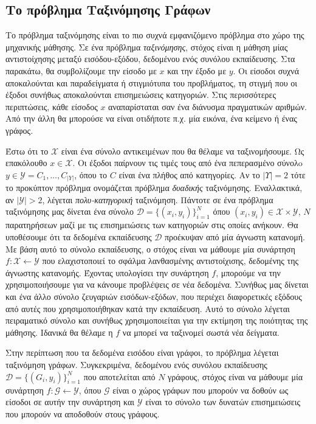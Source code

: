 \subsection{Το πρόβλημα Ταξινόμησης Γράφων}
\label{subsection:graph_classification}
Το πρόβλημα ταξινόμησης είναι το πιο συχνά εμφανιζόμενο πρόβλημα στο χώρο της μηχανικής μάθησης.
Σε ένα πρόβλημα \textit{ταξινόμησης}, στόχος είναι η μάθηση μίας αντιστοίχησης μεταξύ εισόδου-εξόδου, δεδομένου ενός συνόλου εκπαίδευσης.
Στα παρακάτω, θα συμβολίζουμε την είσοδο με $x$ και την έξοδο με $y$.
Οι είσοδοι συχνά αποκαλούνται και παραδείγματα ή στιγμιότυπα του προβλήματος, τη στιγμή που οι έξοδοι συνήθως αποκαλούνται επισημειώσεις κατηγοριών.
Στις περισσότερες περιπτώσεις, κάθε είσοδος $x$ αναπαρίσταται σαν ένα διάνυσμα πραγματικών αριθμών.
Από την άλλη θα μπορούσε να είναι οτιδήποτε π.χ. μία εικόνα, ένα κείμενο ή ένας γράφος.\par
Έστω ότι το $\mathcal{X}$ είναι ένα σύνολο αντικειμένων που θα θέλαμε να ταξινομήσουμε.
Ως επακόλουθο $x \in \mathcal{X}$.
Οι έξοδοι παίρνουν τις τιμές τους από ένα πεπερασμένο σύνολo $y \in \mathcal{Y} = {C_{1}, \dots, C_{|Y|}}$, όπου το $C$ είναι ένα πλήθος από κατηγορίες.
Αν το $|\mathcal{Υ}| = 2$ τότε το προκύπτον πρόβλημα ονομάζεται πρόβλημα \textit{δυαδικής} ταξινόμησης.
Εναλλακτικά, αν $|\mathcal{Y}| > 2$, λέγεται \textit{πολυ-κατηγορική} ταξινόμηση.
Πάντοτε σε ένα πρόβλημα ταξινόμησης μας δίνεται ένα σύνολο $\mathcal{D} = \{(x_{i}, y_{i})\}^{N}_{i=1}$ όπου $(x_{i}, y_{i}) \in \mathcal{X} \times \mathcal{Y}$, $Ν$ παρατηρήσεων μαζί με τις επισημειώσεις των κατηγοριών στις οποίες ανήκουν.
Θα υποθέσουμε ότι τα δεδομένα εκπαίδευσης $\mathcal{D}$ προέκυψαν από μία άγνωστη κατανομή.
Με βάση αυτό το σύνολο εκπαίδευσης, ο στόχος είναι να μάθουμε μία συνάρτηση $f: \mathcal{X} \leftarrow \mathcal{Y}$ που ελαχιστοποιεί το σφάλμα λανθασμένης αντιστοίχισης, δεδομένης της άγνωστης κατανομής.
Έχοντας υπολογίσει την συνάρτηση $f$, μπορούμε να την χρησιμοποιήσουμε για να κάνουμε προβλέψεις σε νέα δεδομένα.
Συνήθως μας δίνεται και ένα άλλο σύνολο ζευγαριών εισόδων-εξόδων, που περιέχει διαφορετικές εξόδους από αυτές που χρησιμοποιήθηκαν κατά την εκπαίδευση.
Αυτό το σύνολο λέγεται πειραματικό σύνολο και συνήθως χρησιμοποιείται για την εκτίμηση της ποιότητας της μάθησης.
Ιδανικά θα θέλαμε η $f$ να μπορεί να ταξινομεί σωστά νέα δείγματα.\par
Στην περίπτωση που τα δεδομένα εισόδου είναι γράφοι, το πρόβλημα λέγεται ταξινόμηση γράφων.
Συγκεκριμένα, δεδομένου ενός συνόλου εκπαίδευσης $\mathcal{D} = \{(G_{i}, y_{i})\}^{N}_{i=1}$ που αποτελείται από $N$ γράφους, στόχος είναι να μάθουμε μία συνάρτηση $f: \mathcal{G} \leftarrow \mathcal{Y}$, όπου $\mathcal{G}$ είναι ο χώρος γράφων που μπορούν να δοθούν ως είσοδοι σε αυτήν την συνάρτηση και $\mathcal{Y}$ είναι το σύνολο των δυνατών επισημειώσεις που μπορούν να αποδοθούν στους γράφους.
